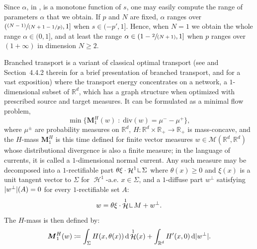 \documentclass[JEP,XML,SOM,Unicode,published]{cedram}
\newcommand{\spfrac}[2]{{\sfrac{#1}{(#2)}}}
\newcommand{\pspfrac}[2]{{\sfrac{(#1)}{(#2)}}}
\theoremstyle{plain}
\theoremstyle{definition}
\newcommand{\dd}{\mathop{}\mathopen{}\mathrm{d}}
\newcommand{\R}{\mathbb{R}}
\newcommand{\Mspace}{\mathscr{M}}
\newcommand{\mass}{\boldsymbol{M}}
\newcommand{\mres}{\mathop{\hbox{\vrule height 6pt width .5pt depth 0pt \vrule height .5pt width 4pt depth 0pt}}\nolimits}
\newcommand{\st}{\;:\;}
\DeclarePairedDelimiter{\abs}{\lvert}{\rvert}
\DeclareMathOperator{\hdm}{\mathcal{H}}
\begin{document}
Since $\alpha$, in , is a monotone function of $s$, one may easily compute the range of parameters $\alpha$ that we obtain. If $p$ and $N$ are fixed, $\alpha$ ranges over $\left(\pspfrac{N-1}{N+1-1/p}, 1\right]$ when $s\in (-p',1]$. Hence, when $N=1$ we obtain the whole range $\alpha \in (0,1]$, and at least the range $\alpha \in \left(1-\spfrac{2}{N+1},1\right]$ when $p$ ranges over $(1+\infty)$ in dimension $N\geq 2$.

\label{branchedTransport}

Branched transport is a variant of classical optimal transport (see \cite{santambrogioOptimalTransportApplied2015} and Section~4.4.2 therein for a brief presentation of branched transport, and \cite{bernotOptimalTransportationNetworks2009} for a vast exposition) where the transport energy concentrates on a network, \ie a \(1\)\nobreakdash-di\-mensional subset of \(\R^d\), which has a graph structure when optimized with prescribed source and target measures. It can be formulated as a minimal flow problem,
\[
\min\Big\{\mass_1^H(w)\st \mathrm{div}(w)=\mu^--\mu^+\Big\},
\]
where \(\mu^\pm\) are probability measures on \(\R^d\), \(H:\R^d\times\R_+\to\R_+\) is mass-concave, and the \(H\)-mass \(\mass_1^H\) is this time defined for finite vector measures $w \in \Mspace(\R^d,\R^d)$ whose distributional divergence is also a finite measure; in the language of currents, it is called a $1$-dimensional normal current. Any such measure may be decomposed into a $1$-rectifiable part $\theta\xi \cdot \hdm^1 \mres \Sigma$ where \(\theta(x)\geq 0\) and \(\xi(x)\) is a unit tangent vector to \(\Sigma\) for \(\hdm^1\)-a.e. \(x\in \Sigma\), and a $1$-diffuse part $w^\perp$ satisfying $\abs{w^\perp}(A) = 0$ for every $1$-rectifiable set $A$:
\[
w=\theta\xi\cdot\hdm^1 \mres M +w^\perp.
\]
The $H$-mass is then defined by:
\begin{equation}
\label{HmassVector}
\mass_1^H(w)\coloneqq\int_\Sigma H(x,\theta(x))\dd\hdm^1(x)+\int_{\R^d} H'(x,0)\dd\abs{w^\perp}.
\end{equation}
\end{document}

